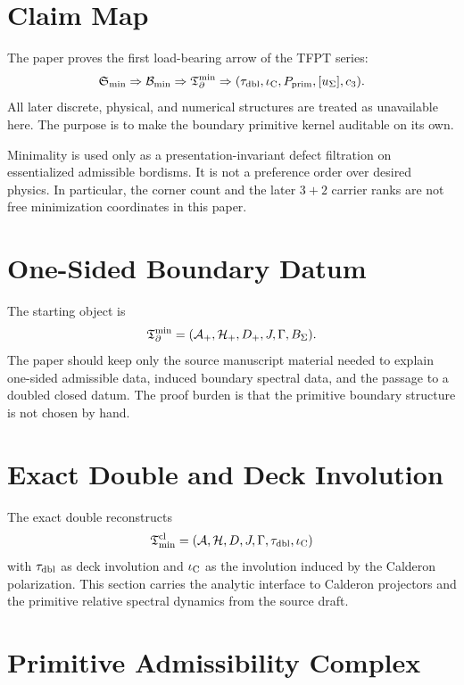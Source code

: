 \documentclass[11pt,a4paper]{article}
\begin{document}
\tableofcontents

\section{Claim Map}

The paper proves the first load-bearing arrow of the TFPT series:
\[
\mathfrak S_{\min}
\Rightarrow
\mathcal B_{\min}
\Rightarrow
\mathfrak T_{\partial}^{\min}
\Rightarrow
(\tau_{\mathrm{dbl}},\iota_{\mathrm C},P_{\mathrm{prim}},[u_\Sigma],c_3).
\]
All later discrete, physical, and numerical structures are treated as unavailable here. The purpose
is to make the boundary primitive kernel auditable on its own.

\begin{tfptwarningbox}
Minimality is used only as a presentation-invariant defect filtration on essentialized admissible
bordisms. It is not a preference order over desired physics. In particular, the corner count and
the later $3+2$ carrier ranks are not free minimization coordinates in this paper.
\end{tfptwarningbox}

\section{One-Sided Boundary Datum}

The starting object is
\[
\mathfrak T_{\partial}^{\min}=(\mathcal A_+,\mathcal H_+,D_+,J,\Gamma,B_\Sigma).
\]
The paper should keep only the source manuscript material needed to explain one-sided admissible
data, induced boundary spectral data, and the passage to a doubled closed datum. The proof burden is
that the primitive boundary structure is not chosen by hand.

\section{Exact Double and Deck Involution}

The exact double reconstructs
\[
\mathfrak T_{\mathrm{min}}^{\mathrm{cl}}=(\mathcal A,\mathcal H,D,J,\Gamma,\tau_{\mathrm{dbl}},\iota_{\mathrm C})
\]
with $\tau_{\mathrm{dbl}}$ as deck involution and $\iota_{\mathrm C}$ as the involution induced by the Calderon polarization.
This section carries the analytic interface to Calderon projectors and the primitive relative
spectral dynamics from the source draft.

\section{Primitive Admissibility Complex}
\end{document}
